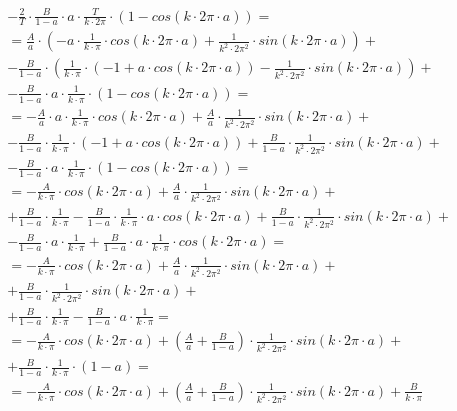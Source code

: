 \begin{task}
\begin{align*}
&- \frac{2}{T}\cdot \frac{B}{1-a}\cdot a \cdot \frac{T}{k \cdot 2\pi} \cdot \left(1 - cos\left(k \cdot 2\pi \cdot a\right) \right)=\\
&=\frac{A}{a}\cdot \left( - a\cdot \frac{1}{k \cdot \pi} \cdot cos\left( k \cdot 2\pi \cdot a\right) + \frac{1}{k^2 \cdot 2\pi^2} \cdot sin\left(k \cdot 2\pi \cdot a\right) \right) + \\
&-\frac{B}{1-a}\cdot \left( \frac{1}{k \cdot \pi} \cdot \left( -1 + a \cdot cos\left( k \cdot 2\pi \cdot a \right)\right) - \frac{1}{k^2 \cdot 2\pi^2} \cdot sin\left( k \cdot 2\pi \cdot a\right)\right) +\\
&- \frac{B}{1-a}\cdot a \cdot \frac{1}{k \cdot \pi} \cdot \left(1 - cos\left(k \cdot 2\pi \cdot a\right) \right)=\\
&= - \frac{A}{a}\cdot a\cdot \frac{1}{k \cdot \pi} \cdot cos\left( k \cdot 2\pi \cdot a\right) + \frac{A}{a}\cdot \frac{1}{k^2 \cdot 2\pi^2} \cdot sin\left(k \cdot 2\pi \cdot a\right) + \\
& -\frac{B}{1-a}\cdot \frac{1}{k \cdot \pi} \cdot \left( -1 + a \cdot cos\left( k \cdot 2\pi \cdot a \right)\right) + \frac{B}{1-a}\cdot \frac{1}{k^2 \cdot 2\pi^2} \cdot sin\left( k \cdot 2\pi \cdot a\right) +\\
&- \frac{B}{1-a}\cdot a \cdot \frac{1}{k \cdot \pi} \cdot \left(1 - cos\left(k \cdot 2\pi \cdot a\right) \right)=\\
&= - \frac{A}{k \cdot \pi} \cdot cos\left( k \cdot 2\pi \cdot a\right) + \frac{A}{a}\cdot \frac{1}{k^2 \cdot 2\pi^2} \cdot sin\left(k \cdot 2\pi \cdot a\right) + \\
& +\frac{B}{1-a}\cdot \frac{1}{k \cdot \pi} -\frac{B}{1-a}\cdot \frac{1}{k \cdot \pi} \cdot a \cdot cos\left( k \cdot 2\pi \cdot a \right) + \frac{B}{1-a}\cdot \frac{1}{k^2 \cdot 2\pi^2} \cdot sin\left( k \cdot 2\pi \cdot a\right) +\\
&- \frac{B}{1-a}\cdot a \cdot \frac{1}{k \cdot \pi} + \frac{B}{1-a}\cdot a \cdot \frac{1}{k \cdot \pi} \cdot cos\left(k \cdot 2\pi \cdot a\right)=\\
&= - \frac{A}{k \cdot \pi} \cdot cos\left( k \cdot 2\pi \cdot a\right) + \frac{A}{a}\cdot \frac{1}{k^2 \cdot 2\pi^2} \cdot sin\left(k \cdot 2\pi \cdot a\right) + \\
& + \frac{B}{1-a}\cdot \frac{1}{k^2 \cdot 2\pi^2} \cdot sin\left( k \cdot 2\pi \cdot a\right) +\\
& +\frac{B}{1-a}\cdot \frac{1}{k \cdot \pi} - \frac{B}{1-a}\cdot a \cdot \frac{1}{k \cdot \pi} =\\
&= - \frac{A}{k \cdot \pi} \cdot cos\left( k \cdot 2\pi \cdot a\right) + \left(\frac{A}{a}+ \frac{B}{1-a}\right)\cdot \frac{1}{k^2 \cdot 2\pi^2} \cdot sin\left(k \cdot 2\pi \cdot a\right) + \\
& +\frac{B}{1-a}\cdot \frac{1}{k \cdot \pi} \cdot \left(1 - a\right) =\\
%
&= - \frac{A}{k \cdot \pi} \cdot cos\left( k \cdot 2\pi \cdot a\right) + \left(\frac{A}{a}+ \frac{B}{1-a}\right)\cdot \frac{1}{k^2 \cdot 2\pi^2} \cdot sin\left(k \cdot 2\pi \cdot a\right) +\frac{B}{k \cdot \pi}\\
\end{align*}


\end{task}
